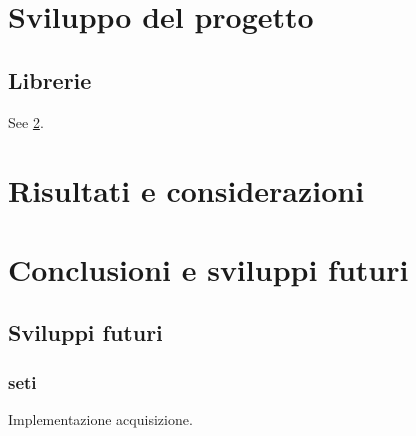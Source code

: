 \documentclass[a4paper,11pt,twoside,openright]{unibo}
\begin{document}
\chapter{Sviluppo del progetto}
\label{sw_devel}
\section{Librerie}
See \ref{tests}.
\chapter{Risultati e considerazioni}
\label{tests}
\chapter{Conclusioni e sviluppi futuri}
\label{conclusions}
\section{Sviluppi futuri}
\subsection{\ac{seti}}
\label{seti}
Implementazione acquisizione.


\end{document}

